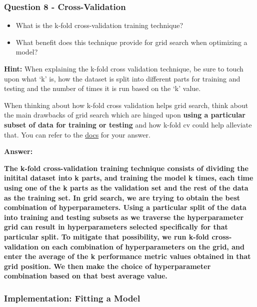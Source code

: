 \documentclass[11pt]{article}
\begin{document}
    \hypertarget{question-8---cross-validation}{%
\subsubsection{Question 8 -
Cross-Validation}\label{question-8---cross-validation}}

\begin{itemize}
\item
  What is the k-fold cross-validation training technique?
\item
  What benefit does this technique provide for grid search when
  optimizing a model?
\end{itemize}

\textbf{Hint:} When explaining the k-fold cross validation technique, be
sure to touch upon what `k' is, how the dataset is split into different
parts for training and testing and the number of times it is run based
on the `k' value.

When thinking about how k-fold cross validation helps grid search, think
about the main drawbacks of grid search which are hinged upon
\textbf{using a particular subset of data for training or testing} and
how k-fold cv could help alleviate that. You can refer to the
\href{http://scikit-learn.org/stable/modules/cross_validation.html\#cross-validation}{docs}
for your answer.

    \textbf{Answer:}

\textbf{The k-fold cross-validation training technique consists of
dividing the initital dataset into k parts, and training the model k
times, each time using one of the k parts as the validation set and the
rest of the data as the training set. In grid search, we are trying to
obtain the best combination of hyperparameters. Using a particular split
of the data into training and testing subsets as we traverse the
hyperparameter grid can result in hyperparameters selected specifically
for that particular split. To mitigate that possibility, we run k-fold
cross-validation on each combination of hyperparameters on the grid, and
enter the average of the k performance metric values obtained in that
grid position. We then make the choice of hyperparameter combination
based on that best average value.}

    \hypertarget{implementation-fitting-a-model}{%
\subsubsection{Implementation: Fitting a
Model}\label{implementation-fitting-a-model}}
\end{document}
